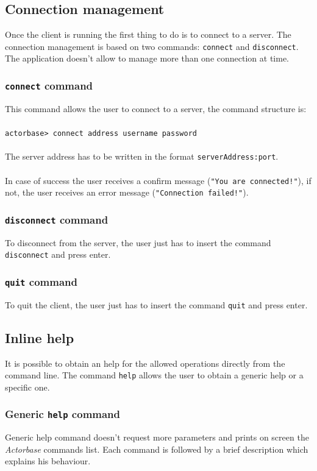 \documentclass[a4paper]{article}
\begin{document}
	\subsection{Connection management}
	Once the client is running the first thing to do is to connect to a server. The connection management is based on two commands: \texttt{connect} and \texttt{disconnect}. The application doesn't allow to manage more than one connection at time.
	
	\subsubsection{\texttt{connect} command}
	This command allows the user to connect to a server, the command structure is:
	\\ \\
	\texttt{actorbase>	connect address username password}
	\\ \\
	The server address has to be written in the format \texttt{serverAddress:port}. \\ \\
	In case of success the user receives a confirm message (\texttt{"You are connected!"}), if not, the user receives an error message (\texttt{"Connection failed!"}).
	
	\subsubsection{\texttt{disconnect} command}
	To disconnect from the server, the user just has to insert the command \texttt{disconnect} and press enter.
	
	\subsubsection{\texttt{quit} command}
	To quit the client, the user just has to insert the command \texttt{quit} and press enter.

	\subsection{Inline help}
	It is possible to obtain an help for the allowed operations directly from the command line. The command \texttt{help} allows the user to obtain a generic help or a specific one.
	
	\subsubsection{Generic \texttt{help} command}
	Generic help command doesn't request more parameters and prints on screen the \emph{Actorbase} commands list. Each command is followed by a brief description which explains his behaviour.
	
\end{document}
